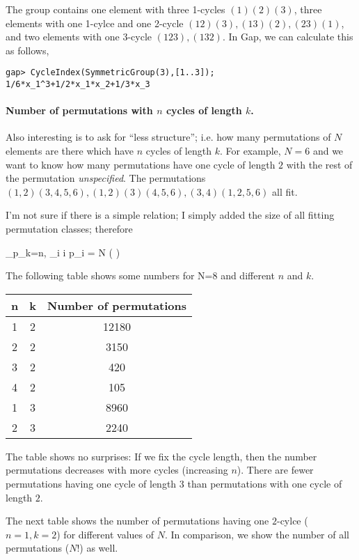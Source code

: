 The group contains one element with three 1-cycles $(1)(2)(3)$, three elements with one 1-cylce and one 2-cycle $(12)(3), (13)(2), (23)(1)$, and two elements with one 3-cycle $(123),(132)$. In Gap, we can calculate this as follows,

\begin{verbatim}
gap> CycleIndex(SymmetricGroup(3),[1..3]);
1/6*x_1^3+1/2*x_1*x_2+1/3*x_3
\end{verbatim}


\paragraph{Number of permutations with $n$ cycles of length $k$.} Also interesting is to ask for ``less structure''; i.e. how many permutations of $N$ elements are there which have $n$ cycles of length $k$. For example, $N=6$ and we want to know how many permutations have one cycle of length $2$ with the rest of the permutation \emph{unspecified}. The permutations $(1,2)(3,4,5,6), (1,2)(3)(4,5,6), (3,4)(1,2,5,6)$ all fit.

I'm not sure if there is a simple relation; I simply added the size of all fitting permutation classes; therefore

\bee
\sum_{p_k=n, \sum_i i p_i = N } \left(  \right)
\eee

The following table shows some numbers for N=8 and different $n$ and $k$.

\vspace{2mm}

\begin{tabular}{ccc}
  n  & k & Number of permutations \\ \hline
  1  & 2 & 12180 \\
  2  & 2 & 3150 \\
  3  &2 & 420 \\
  4  &2 & 105 \\ \hline
  1  &3 & 8960 \\
  2  &3 & 2240 \\
\end{tabular}

\vspace{2mm}

The table shows no surprises: If we fix the cycle length, then the number permutations decreases with more cycles (increasing $n$). There are fewer permutations having one cycle of length $3$ than permutations with one cycle of length $2$.

The next table shows the number of permutations having one $2$-cylce ($n=1, k=2$) for different values of $N$. In comparison, we show the number of all permutations ($N!$) as well. 

